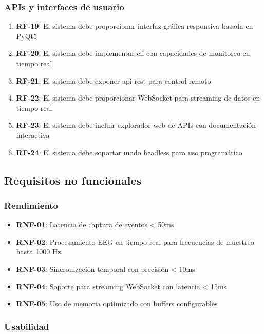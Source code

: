 \subsubsection{APIs y interfaces de usuario}
\label{subsubsec:req_interfaces}

\begin{enumerate}
    \item \textbf{RF-19}: El sistema debe proporcionar interfaz gráfica responsiva basada en PyQt5
    \item \textbf{RF-20}: El sistema debe implementar \acrshort{cli} con capacidades de monitoreo en tiempo real
    \item \textbf{RF-21}: El sistema debe exponer \acrshort{api} \acrshort{rest} para control remoto
    \item \textbf{RF-22}: El sistema debe proporcionar WebSocket para streaming de datos en tiempo real
    \item \textbf{RF-23}: El sistema debe incluir explorador web de APIs con documentación interactiva
    \item \textbf{RF-24}: El sistema debe soportar modo headless para uso programático
\end{enumerate}

\subsection{Requisitos no funcionales}
\label{subsec:requisitos_no_funcionales}

\subsubsection{Rendimiento}
\label{subsubsec:req_rendimiento}

\begin{itemize}
    \item \textbf{RNF-01}: Latencia de captura de eventos < 50ms
    \item \textbf{RNF-02}: Procesamiento EEG en tiempo real para frecuencias de muestreo hasta 1000 Hz
    \item \textbf{RNF-03}: Sincronización temporal con precisión < 10ms
    \item \textbf{RNF-04}: Soporte para streaming WebSocket con latencia < 15ms
    \item \textbf{RNF-05}: Uso de memoria optimizado con buffers configurables
\end{itemize}

\subsubsection{Usabilidad}
\label{subsubsec:req_usabilidad}

